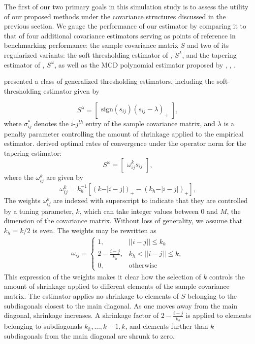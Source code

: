 The first of our two primary goals in this simulation study is to assess the utility of our proposed methods under the covariance structures discussed in the previous section. We gauge the performance of our estimator by comparing it to that of four additional covariance estimators serving as points of reference in benchmarking performance: the sample covariance matrix $S$ and two of its regularized variants: the soft thresholding estimator of \citet{rothman2009generalized},  $S^\lambda$, and the tapering estimator of \citet{cai2010optimal}, $S^\omega$, as well as the MCD polynomial estimator proposed by \citet{pourahmadi1999joint}, \citet{pan2006regression}, \citet{pourahmadi2002dynamic}. 

\bigskip

\citet{rothman2009generalized} presented a class of generalized thresholding estimators, including the soft-thresholding estimator given by

\[
S^{\lambda}=   \begin{bmatrix} \mbox{sign}\left(s_{ij}\right) \left(s_{ij} - \lambda\right)_+ \end{bmatrix},
\]
\noindent 
where $\sigma^*_{ij}$ denotes the $i$-$j^{th}$ entry of the sample covariance matrix, and $\lambda$ is a penalty parameter controlling the amount of shrinkage applied to the empirical estimator. \citet{cai2010optimal} derived optimal rates of convergence under the operator norm for the tapering estimator:
\[
S^{\omega} =  \begin{bmatrix} \omega_{ij}^k s_{ij} \end{bmatrix},
\]
\noindent
where the $\omega_{ij}^k$ are given by 
\begin{equation*}
\omega^k_{ij} = k_h^{-1} \left[ \left( k - \vert i-j\vert\right)_+ - \left(k_h - \vert i-j\vert\right)_+ \right],
\end{equation*}
\noindent
The weights $\omega^k_{ij}$ are indexed with superscript to indicate that they  are controlled by a tuning parameter, $k$,  which can take integer values between 0 and $M$, the dimension of the covariance matrix.  Without loss of generality,  we assume that $k_h = k/2$ is even. The weights may be rewritten as
\begin{align*}
\omega_{ij} = \left\{\begin{array}{ll} 1, & \vert \vert i -j \vert \vert \le k_h \\
                             2 - \frac{i - j}{k_h}, & k_h < \vert \vert i -j \vert \vert \le k, \\
                             0, & \mbox{otherwise}  \end{array} \right.
\end{align*}
\noindent
This expression of the weights makes it clear how the selection of $k$ controls the amount of shrinkage applied to different elements of the sample covariance matrix. The estimator applies no shrinkage to elements of $S$ belonging to the subdiagonals closest to the main diagonal. As one moves away from the main diagonal, shrinkage increases. A shrinkage factor of $2 - \frac{i - j}{k_h}$ is applied to elements belonging to subdiagonals $k_h,\dots,k-1,k$, and elements further than $k$ subdiagonals from the main diagonal are shrunk to zero.   

